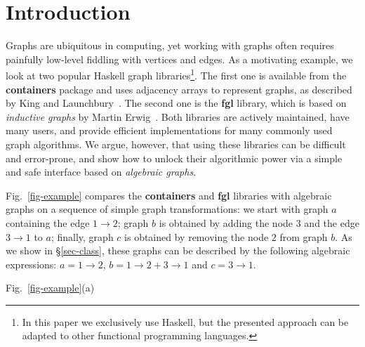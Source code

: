 \documentclass[acmlarge,anonymous]{acmart}\settopmatter{printfolios=true}
\begin{document}
\maketitle

\section{Introduction}

Graphs are ubiquitous in computing, yet working with graphs often requires
painfully low-level fiddling with vertices and edges. As a motivating
example, we look at two popular Haskell graph libraries\footnote{In this paper
we exclusively use Haskell, but the presented approach can be adapted to
other functional programming languages.}. The first one is available from the
\textbf{\textsf{containers}} package and uses adjacency arrays to represent graphs,
as described by King and Launchbury~\citeyear{1995_king_graphs}. The second one
is the \textbf{\textsf{fgl}} library, which is based on \emph{inductive graphs}
by Martin Erwig~\citeyear{2001_erwig_inductive}. Both libraries are
actively maintained, have many users, and provide efficient implementations for
many commonly used graph algorithms. We argue, however, that using these libraries
can be difficult and error-prone, and show how to unlock their algorithmic power
via a simple and safe interface based on \emph{algebraic graphs}.

Fig.~\ref{fig-example} compares the \textbf{\textsf{containers}} and
\textbf{\textsf{fgl}} libraries with algebraic graphs on a sequence of
simple graph transformations: we start with graph $a$ containing the
edge $1 \rightarrow 2$; graph $b$ is obtained by adding the node $3$
and the edge $3 \rightarrow 1$ to $a$; finally, graph $c$ is obtained by removing
the node $2$ from graph $b$. As we show in \S\ref{sec-class}, these graphs can be
described by the following algebraic expressions: $a = 1 \rightarrow 2$,
$b = 1 \rightarrow 2 + 3 \rightarrow 1$ and $c = 3 \rightarrow 1$.

Fig.~\ref{fig-example}(a)
\end{document}
